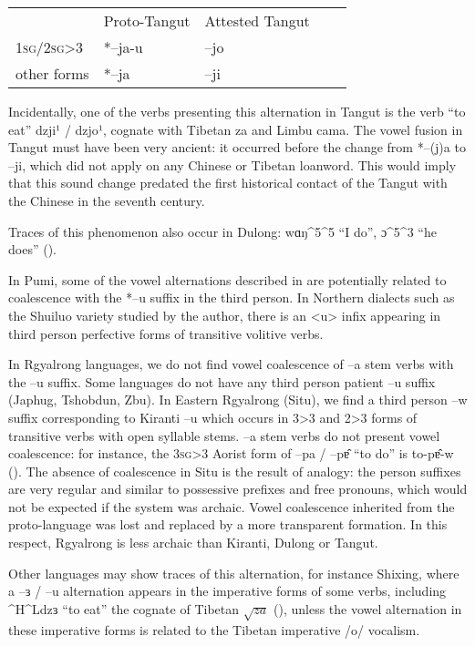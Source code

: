 \documentclass[oldfontcommands,twoside,a4paper,12pt]{memoir}
\newcommand{\ipa}[1]{{\phon #1}}
\newcommand{\ipapl}[1]{{\phondroit #1}}
\newcommand{\sg}{\textsc{sg}}
\newcommand{\racine}[1]{\begin{math}\sqrt{#1}\end{math}}
\begin{document}
\begin{tabular}{lllll}  
&Proto-Tangut & Attested Tangut \\
1\sg{}/2\sg{}>3 & *--ja-u & --jo \\
other forms & *--ja & --ji \\
\end{tabular}

Incidentally, one of the verbs presenting this alternation in Tangut is the verb ``to eat''   \ipa{dzji¹} /  \ipa{dzjo¹}, cognate with Tibetan \ipa{za} and Limbu \ipa{cama}. The vowel fusion in Tangut must have been very ancient: it occurred before the change from *--(j)a to --ji, which did not apply on any Chinese or Tibetan loanword. This would imply that this sound change predated the first historical contact of the Tangut with the Chinese in the seventh century.

Traces of this phenomenon also occur in Dulong: \ipa{wɑŋ^5^5} ``I do'', \ipa{ɔ^5^3} ``he does'' (\citealt[pp. 91-92]{sunhk82dulong}). 

In Pumi, some of the vowel alternations described in \citet[pp. 106-112]{fual98pumi} are potentially related to coalescence with the *--u suffix in the third person. In Northern dialects such as the Shuiluo variety studied by the author, there is an <u> infix appearing in third person perfective forms of transitive volitive verbs. 

In Rgyalrong languages, we do not find vowel coalescence of --a stem verbs with the --u suffix. Some languages do not have any third person patient --u suffix (Japhug, Tshobdun, Zbu). In Eastern Rgyalrong (Situ), we find a third person --w suffix corresponding to Kiranti --u which occurs in 3>3 and 2>3 forms of transitive verbs with open syllable stems. --a stem verbs do not present vowel coalescence: for instance, the 3\sg{}>3 Aorist form of \ipa{--pa} / \ipa{--pɐ̂} ``to do'' is \ipa{to-pɐ̂-w} (\citealt[p. 264]{youjing03zhuokeji}). The absence of coalescence in Situ is the result of analogy: the person suffixes are very regular and similar to possessive prefixes and free pronouns, which would not be expected if the system was archaic. Vowel coalescence inherited from the proto-language was lost and replaced by a more transparent formation. In this respect, Rgyalrong is less archaic than Kiranti, Dulong or Tangut.

Other languages may show traces of this alternation, for instance Shixing, where a --\ipapl{ɜ} / --u alternation appears in the imperative forms of some verbs, including \ipa{^H^Ldzɜ} ``to eat'' the cognate of Tibetan \racine{za} (\citealt[p. 40]{chirkova09grammar}), unless the vowel alternation in these imperative forms is related to the Tibetan imperative /o/ vocalism.
\end{document}
